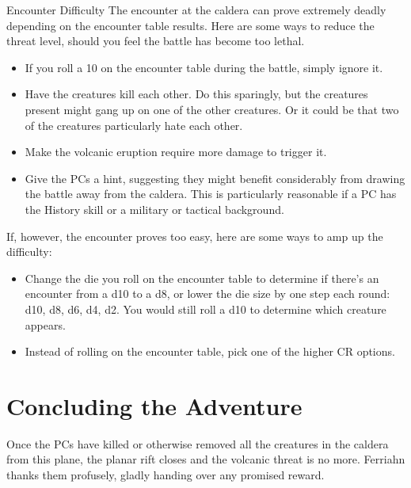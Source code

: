 \documentclass[10pt,a4paper,twoside,bg=print,twocolumn,openany,nodeprecatedcode]{dndbook}
\begin{document}
\begin{DndSidebar}[float=!b]{Encounter Difficulty}
The encounter at the caldera can prove extremely deadly depending on the encounter table results. Here are some ways to reduce the threat level, should you feel the battle has become too lethal.




\begin{itemize}
\item If you roll a 10 on the encounter table during the battle, simply ignore it.
\item Have the creatures kill each other. Do this sparingly, but the creatures present might gang up on one of the other creatures. Or it could be that two of the creatures particularly hate each other.
\item Make the volcanic eruption require more damage to trigger it.
\item Give the PCs a hint, suggesting they might benefit considerably from drawing the battle away from the caldera. This is particularly reasonable if a PC has the History skill or a military or tactical background.
\end{itemize}



If, however, the encounter proves too easy, here are some ways to amp up the difficulty:




\begin{itemize}
\item Change the die you roll on the encounter table to determine if there's an encounter from a d10 to a d8, or lower the die size by one step each round: d10, d8, d6, d4, d2. You would still roll a d10 to determine which creature appears.
\item Instead of rolling on the encounter table, pick one of the higher CR options.
\end{itemize}



\end{DndSidebar}

\section{Concluding the Adventure}
Once the PCs have killed or otherwise removed all the creatures in the caldera from this plane, the planar rift closes and the volcanic threat is no more. Ferriahn thanks them profusely, gladly handing over any promised reward.
\end{document}
